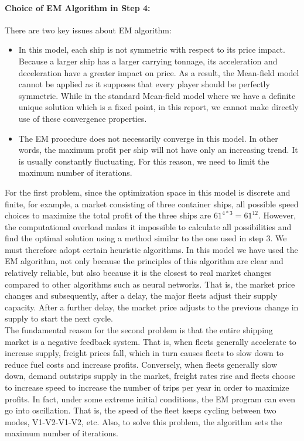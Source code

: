 \documentclass[a4paper,12pt]{article}
\begin{document}
\paragraph{Choice of EM Algorithm in Step 4:}

There are two key issues about EM algorithm:
\begin{itemize}
	\item In this model, each ship is not symmetric with respect to its price impact. Because a larger ship has a larger carrying tonnage, its acceleration and deceleration have a greater impact on price. As a result, the Mean-field model cannot be applied as it supposes that every player should be perfectly symmetric. While in the standard Mean-field model where we have a definite unique solution which is a fixed point, in this report, we cannot make directly use of these convergence properties.
	\item The EM procedure does not necessarily converge in this model. In other words, the maximum profit per ship will not have only an increasing trend. It is usually constantly fluctuating. For this reason, we need to limit the maximum number of iterations.
\end{itemize}

For the first problem, since the optimization space in this model is discrete and finite, for example, a market consisting of three container ships, all possible speed choices to maximize the total profit of the three ships are $61^{4*3} = 61^{12}$.
However, the computational overload makes it impossible to calculate all possibilities and find the optimal solution using a method similar to the one used in step 3.
We must therefore adopt certain heuristic algorithms.
In this model we have used the EM algorithm, not only because the principles of this algorithm are clear and relatively reliable, but also because it is the closest to real market changes compared to other algorithms such as neural networks.
That is, the market price changes and subsequently, after a delay, the major fleets adjust their supply capacity.
After a further delay, the market price adjusts to the previous change in supply to start the next cycle.\\

The fundamental reason for the second problem is that the entire shipping market is a negative feedback system.
That is, when fleets generally accelerate to increase supply, freight prices fall, which in turn causes fleets to slow down to reduce fuel costs and increase profits.
Conversely, when fleets generally slow down, demand outstrips supply in the market, freight rates rise and fleets choose to increase speed to increase the number of trips per year in order to maximize profits.
In fact, under some extreme initial conditions, the EM program can even go into oscillation. That is, the speed of the fleet keeps cycling between two modes, V1-V2-V1-V2, etc.
Also, to solve this problem, the algorithm sets the maximum number of iterations.
\end{document}
